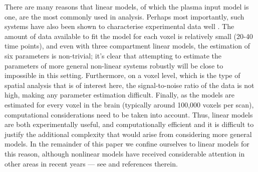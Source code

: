 There are many reasons that linear \ode models, of which the plasma input
model is one, are the most commonly used in \pet analysis. Perhaps most
importantly, such systems have also been shown to characterise \pet
experimental data well \cite{Lammertsma96}. The amount of data available
to fit the model for each voxel is relatively small (20-40 time points),
and even with three compartment linear \ode models, the estimation of six
parameters is non-trivial; it's clear that attempting to estimate the
parameters of more general non-linear \ode systems robustly will be close
to impossible in this setting. Furthermore, on a voxel level, which is the
type of spatial analysis that is of interest here, the signal-to-noise
ratio of the data is not high, making any parameter estimation difficult.
Finally, as the models are estimated for every voxel in the brain
(typically around 100,000 voxels per scan), computational considerations
need to be taken into account. Thus, linear \ode models are both
experimentally useful, and computationally efficient and it is difficult to
justify the additional complexity that would arise from considering more
general models. In the remainder of this paper we confine ourselves to
linear \ode models for this reason, although nonlinear \ode models have
received considerable attention in other areas in recent years --- see
\cite{Lawson2011} and references therein.

